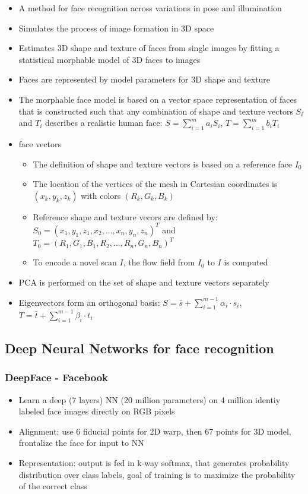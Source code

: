 \documentclass[paper=a4, fontsize=11pt]{scrartcl} %
\numberwithin{equation}{section} %
\numberwithin{figure}{section} %
\numberwithin{table}{section} %
\begin{document}
\begin{itemize}
\item A method for face recognition across variations in pose and illumination
\item Simulates the process of image formation in 3D space
\item Estimates 3D shape and texture of faces from single images by fitting a statistical morphable model of 3D faces to images
\item Faces are represented by model parameters for 3D shape and texture
\item The morphable face model is based on a vector space representation of faces that is constructed such that any combination of shape and texture vectors $S_i$ and $T_i$ describes a realistic human face: $S = \sum\limits_{i=1}^m a_i S_i$, $T = \sum\limits_{i=1}^m b_i T_i$
\item face vectors
\begin{itemize}
\item The definition of shape and texture vectors is based on a reference face $I_0$
\item The location of the vertices of the mesh in Cartesian coordinates is $(x_k,y_k,z_k)$ with colors $(R_k,G_k,B_k)$
\item Reference shape and texture vecors are defined by: $S_0 = (x_1,y_1,z_1,x_2,...,x_n,y_n,z_n)^T$ and $T_0 = (R_1,G_1,B_1,R_2,...,R_n,G_n,B_n)^T$
\item To encode a novel scan $I$, the flow field from $I_0$ to $I$ is computed
\end{itemize}
\item PCA is performed on the set of shape and texture vectors separately
\item Eigenvectors form an orthogonal basis: $S = \bar{s} + \sum\limits_{i=1}^{m-1} \alpha_i \cdot s_i$, $T = \bar{t} + \sum\limits_{i=1}^{m-1} \beta_i \cdot t_i$
\end{itemize}

\subsection{Deep Neural Networks for face recognition}

\subsubsection{DeepFace - Facebook}

\begin{itemize}
\item Learn a deep (7 layers) NN (20 million parameters) on 4 million identiy labeled face images directly on RGB pixels
\item Alignment: use 6 fiducial points for 2D warp, then 67 points for 3D model, frontalize the face for input to NN
\item Representation: output is fed in k-way softmax, that generates probability distribution over class labels, goal of training is to maximize the probability of the correct class
\end{itemize}
\end{document}
